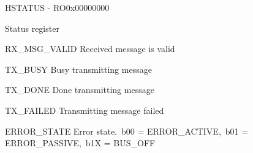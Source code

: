 \documentclass{article}
\begin{document}
\begin{register}{H}{STATUS - RO}{0x00000000}  \par Status register \regnewline
  \label{STATUS}
\regnewline
  \begin{regdesc}\begin{reglist}
    \item [RX{\_}MSG{\_}VALID] Received message is valid    \item [TX{\_}BUSY] Busy transmitting message    \item [TX{\_}DONE] Done transmitting message    \item [TX{\_}FAILED] Transmitting message failed    \item [ERROR{\_}STATE] Error state.\ b00 = ERROR{\_}ACTIVE,\ b01 = ERROR{\_}PASSIVE,\ b1X = BUS{\_}OFF  \end{reglist}\end{regdesc}
\end{register}
\end{document}
